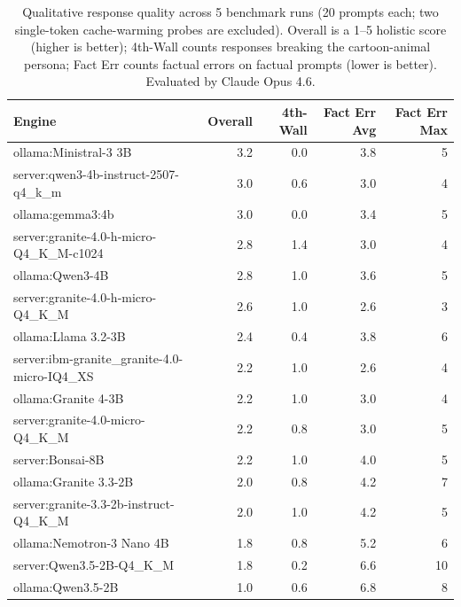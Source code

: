 \begin{table}[h]
\centering
\small
\begin{tabular}{l|r|r|r|r}
\toprule
Engine & Overall & 4th-Wall & Fact Err Avg & Fact Err Max \\
\midrule
ollama:Ministral-3 3B & 3.2 & 0.0 & 3.8 & 5 \\
server:qwen3-4b-instruct-2507-q4\_k\_m & 3.0 & 0.6 & 3.0 & 4 \\
ollama:gemma3:4b & 3.0 & 0.0 & 3.4 & 5 \\
server:granite-4.0-h-micro-Q4\_K\_M-c1024 & 2.8 & 1.4 & 3.0 & 4 \\
ollama:Qwen3-4B & 2.8 & 1.0 & 3.6 & 5 \\
server:granite-4.0-h-micro-Q4\_K\_M & 2.6 & 1.0 & 2.6 & 3 \\
ollama:Llama 3.2-3B & 2.4 & 0.4 & 3.8 & 6 \\
server:ibm-granite\_granite-4.0-micro-IQ4\_XS & 2.2 & 1.0 & 2.6 & 4 \\
ollama:Granite 4-3B & 2.2 & 1.0 & 3.0 & 4 \\
server:granite-4.0-micro-Q4\_K\_M & 2.2 & 0.8 & 3.0 & 5 \\
server:Bonsai-8B & 2.2 & 1.0 & 4.0 & 5 \\
ollama:Granite 3.3-2B & 2.0 & 0.8 & 4.2 & 7 \\
server:granite-3.3-2b-instruct-Q4\_K\_M & 2.0 & 1.0 & 4.2 & 5 \\
ollama:Nemotron-3 Nano 4B & 1.8 & 0.8 & 5.2 & 6 \\
server:Qwen3.5-2B-Q4\_K\_M & 1.8 & 0.2 & 6.6 & 10 \\
ollama:Qwen3.5-2B & 1.0 & 0.6 & 6.8 & 8 \\
\bottomrule
\end{tabular}
\caption{Qualitative response quality across 5 benchmark runs (20 prompts each; two single-token cache-warming probes are excluded). Overall is a 1--5 holistic score (higher is better); 4th-Wall counts responses breaking the cartoon-animal persona; Fact Err counts factual errors on factual prompts (lower is better). Evaluated by Claude Opus 4.6.}
\label{tab:quality}
\end{table}

